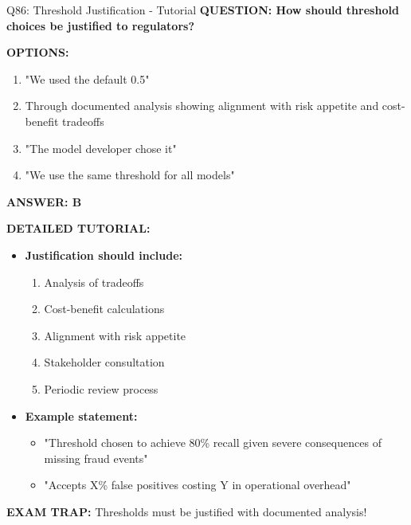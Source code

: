 \documentclass[8pt]{beamer}
\begin{document}
\begin{frame}{Q86: Threshold Justification - Tutorial}
	\fontsize{6.5}{7.5}\selectfont
	\textbf{QUESTION: How should threshold choices be justified to regulators?}
	
	\vspace{0.1cm}
	\textbf{OPTIONS:}
	\begin{enumerate}
		\item "We used the default 0.5"
		\item Through documented analysis showing alignment with risk appetite and cost-benefit tradeoffs
		\item "The model developer chose it"
		\item "We use the same threshold for all models"
	\end{enumerate}
	
	\vspace{0.1cm}
	\textcolor{myblue}{\textbf{ANSWER: B}}
	
	\vspace{0.1cm}
	\textbf{DETAILED TUTORIAL:}
	\begin{itemize}
		\item \textbf{Justification should include:}
		\begin{enumerate}
			\item Analysis of tradeoffs
			\item Cost-benefit calculations
			\item Alignment with risk appetite
			\item Stakeholder consultation
			\item Periodic review process
		\end{enumerate}
		\item \textbf{Example statement:}
		\begin{itemize}
			\item "Threshold chosen to achieve 80\% recall given severe consequences of missing fraud events"
			\item "Accepts X\% false positives costing Y in operational overhead"
		\end{itemize}
	\end{itemize}
	
	\textcolor{myred}{\textbf{EXAM TRAP:}} Thresholds must be \textcolor{myblue}{justified with documented analysis}!
\end{frame}
\end{document}
